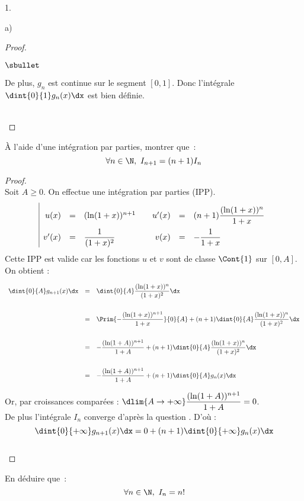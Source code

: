 \documentclass[11pt]{article}%
\begin{document}
\begin{noliste}{1.}
\begin{noliste}{a)}
\begin{proof}
\begin{noliste}{$\sbullet$}
  \item De plus, $g_n$ est continue sur le segment $[0,1]$. Donc 
  l'intégrale $\dint{0}{1} g_n(x) \dx$ est bien définie.
 \end{noliste}
 ~\\[-1.4cm]
\end{proof}


\item À l'aide d'une intégration par parties, montrer que~:
\[ 
\forall n \in \N, \ I_{n+1} = (n+1) I_n 
\]

\begin{proof}~\\
  Soit $A\geq 0$. On effectue une intégration par parties (IPP).
  \[
  \renewcommand{\arraystretch}{2.2}
  \begin{array}{|rcl@{\qquad}rcl}
   u(x) & = & (\ln(1+x))^{n+1} & u'(x) & = & (n+1) 
   \dfrac{(\ln(1+x))^n}{1+x} \\
   v'(x) & = & \dfrac{1}{(1+x)^2} & v(x) & = & -\dfrac{1}{1+x}
  \end{array}
  \]
Cette IPP est valide car les fonctions $u$ et $v$ sont de classe 
$\Cont{1}$ sur $[0,A]$. On obtient :
\[
 \begin{array}{rcl}
  \dint{0}{A} g_{n+1}(x) \dx & = & \dint{0}{A} \dfrac{(\ln(1+x))^n}
  {(1+x)^2} \dx 
  \\[.6cm]
  & = & \Prim{-\dfrac{(\ln(1+x))^{n+1}}{1+x}}{0}{A} + (n+1)
   \dint{0}{A}\dfrac{(\ln(1+x))^n}{(1+x)^2} \dx
   \\[.6cm]
   & = & -\dfrac{(\ln(1+A))^{n+1}}{1+A} + (n+1) \dint{0}{A} 
   \dfrac{(\ln(1+x))^n}{(1+x)^2} \dx
   \\[.6cm]
   & = & -\dfrac{(\ln(1+A))^{n+1}}{1+A} + (n+1) \dint{0}{A} 
   g_n(x) \dx
 \end{array}
\]




Or, par croissances comparées : $\dlim{A\to+\infty} 
\dfrac{(\ln(1+A))^{n+1}}{1+A} = 0$.\\[.2cm]
De plus l'intégrale $I_n$ converge d'après la question . 
D'où :
\[
 \dint{0}{+\infty} g_{n+1}(x) \dx = 0+(n+1) \dint{0}{+\infty} 
 g_n(x) \dx
\]
~\\[-1.2cm]
\end{proof}

\item En déduire que~:
  \[ 
  \forall n \in \N, \ I_n = n! 
  \]


\end{noliste}
\end{noliste}
\end{document}
